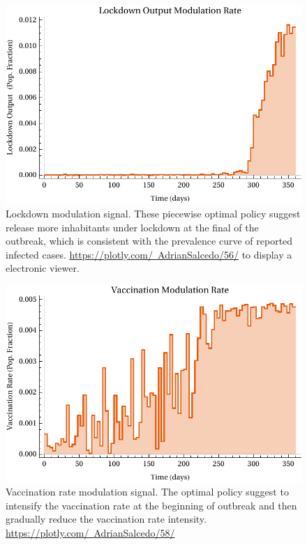 %
\begin{figure}[tbh]
    \centering
    \includegraphics[width=0.7\linewidth]{figs/lockdown_control_signal}
    \caption[Lockdown modulation signal.]{
        Lockdown modulation signal. These piecewise optimal policy suggest
        release more inhabitants under lockdown at
        the final of the outbreak, which is consistent with the prevalence
        curve of reported infected cases.
        \href{https://plotly.com/~AdrianSalcedo/56/}{%
            https://plotly.com/~AdrianSalcedo/56/}
        to display a electronic viewer.
}
    \label{fig:lockdowncontrolsignal}
\end{figure}

\begin{figure}
    \centering
    \includegraphics[width=0.7\linewidth]{figs/Vaccination_control_signal}
    \caption[Vaccination rate modulation.]{
        Vaccination rate modulation signal. The optimal policy suggest to
        intensify the vaccination rate at the beginning of outbreak and then
        gradually reduce the vaccination rate intensity.
        \href{https://plotly.com/~AdrianSalcedo/58/}{%
            https://plotly.com/~AdrianSalcedo/58/}
    }
    \label{fig:vaccinationcontrolsignal}
\end{figure}

